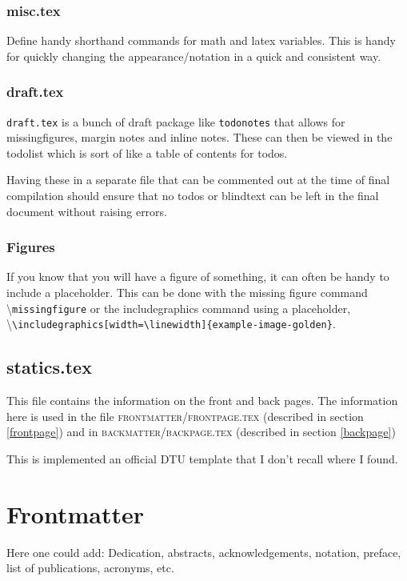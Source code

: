 \subsubsection{misc.tex}
Define handy shorthand commands for math and latex variables. This is handy for quickly changing the appearance/notation in a quick and consistent way.

\subsubsection{draft.tex}
\texttt{draft.tex} is a bunch of draft package like \texttt{todonotes} that allows for missingfigures, margin notes and inline notes. These can then be viewed in the todolist which is sort of like a table of contents for todos.


Having these in a separate file that can be commented out at the time of final compilation should ensure that no todos or blindtext can be left in the final document without raising errors.

\subsubsection{Figures}
If you know that you will have a figure of something, it can often be handy to include a placeholder. This can be done with the missing figure command \textbackslash\texttt{missingfigure} or the includegraphics command using a placeholder, \textbackslash\texttt{\textbackslash includegraphics[width=\textbackslash linewidth]\{example-image-golden\}}.




\subsection{statics.tex}
This file contains the information on the front and back pages. The information here is used in the file \textsc{frontmatter/frontpage.tex} (described in section \ref{frontpage}) and in  \textsc{backmatter/backpage.tex} (described in section \ref{backpage}) 

This is implemented an official DTU template that I don't recall where I found.


\section{Frontmatter}
Here one could add: Dedication, abstracts, acknowledgements, notation, preface, list of publications, acronyms, etc.

